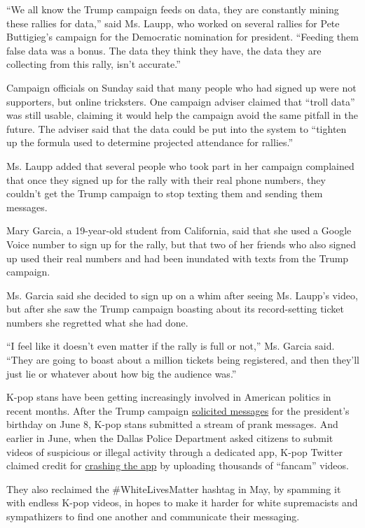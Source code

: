 ``We all know the Trump campaign feeds on data, they are constantly
mining these rallies for data,'' said Ms. Laupp, who worked on several
rallies for Pete Buttigieg's campaign for the Democratic nomination for
president. ``Feeding them false data was a bonus. The data they think
they have, the data they are collecting from this rally, isn't
accurate.''

Campaign officials on Sunday said that many people who had signed up
were not supporters, but online tricksters. One campaign adviser claimed
that ``troll data'' was still usable, claiming it would help the
campaign avoid the same pitfall in the future. The adviser said that the
data could be put into the system to ``tighten up the formula used to
determine projected attendance for rallies.''

Ms. Laupp added that several people who took part in her campaign
complained that once they signed up for the rally with their real phone
numbers, they couldn't get the Trump campaign to stop texting them and
sending them messages.

Mary Garcia, a 19-year-old student from California, said that she used a
Google Voice number to sign up for the rally, but that two of her
friends who also signed up used their real numbers and had been
inundated with texts from the Trump campaign.

Ms. Garcia said she decided to sign up on a whim after seeing Ms.
Laupp's video, but after she saw the Trump campaign boasting about its
record-setting ticket numbers she regretted what she had done.

``I feel like it doesn't even matter if the rally is full or not,'' Ms.
Garcia said. ``They are going to boast about a million tickets being
registered, and then they'll just lie or whatever about how big the
audience was.''

K-pop stans have been getting increasingly involved in American politics
in recent months. After the Trump campaign
\href{https://twitter.com/TeamTrump/status/1270127968736677888}{solicited
messages} for the president's birthday on June 8, K-pop stans submitted
a stream of prank messages. And earlier in June, when the Dallas Police
Department asked citizens to submit videos of suspicious or illegal
activity through a dedicated app, K-pop Twitter claimed credit for
\href{https://melmagazine.com/en-us/story/what-we-can-learn-from-k-pop-stans-about-fighting-fascism}{crashing
the app} by uploading thousands of ``fancam'' videos.

They also reclaimed the \#WhiteLivesMatter hashtag in May, by spamming
it with endless K-pop videos, in hopes to make it harder for white
supremacists and sympathizers to find one another and communicate their
messaging.


